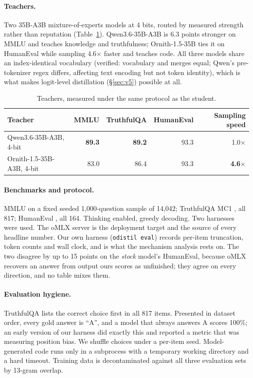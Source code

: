 \documentclass[11pt]{article}
\begin{document}
\paragraph{Teachers.}
Two 35B-A3B mixture-of-experts models at 4 bits, routed by measured strength
rather than reputation (Table~\ref{tab:teachers}).  Qwen3.6-35B-A3B is 6.3
points stronger on MMLU and teaches knowledge and truthfulness; Ornith-1.5-35B
ties it on HumanEval while sampling 4.6$\times$ faster and teaches code.  All
three models share an index-identical vocabulary (verified: vocabulary and
merges equal; Qwen's pre-tokenizer regex differs, affecting text encoding but
not token identity), which is what makes logit-level distillation
(\S\ref{sec:v5}) possible at all.

\begin{table}[t]
\centering
\caption{Teachers, measured under the same protocol as the student.}
\label{tab:teachers}
\begin{tabular}{lrrrr}
\toprule
Teacher & MMLU & TruthfulQA & HumanEval & Sampling speed \\
\midrule
Qwen3.6-35B-A3B, 4-bit & \textbf{89.3} & \textbf{89.2} & 93.3 & 1.0$\times$ \\
Ornith-1.5-35B-A3B, 4-bit & 83.0 & 86.4 & 93.3 & \textbf{4.6}$\times$ \\
\bottomrule
\end{tabular}
\end{table}

\paragraph{Benchmarks and protocol.}
MMLU \citep{hendrycks2021mmlu} on a fixed seeded 1{,}000-question sample of
14{,}042; TruthfulQA MC1 \citep{lin2022truthfulqa}, all 817; HumanEval
\citep{chen2021humaneval}, all 164.  Thinking enabled, greedy decoding.  Two
harnesses were used.  The oMLX server is the deployment target and the source
of every headline number.  Our own harness (\texttt{odistil eval}) records
per-item truncation, token counts and wall clock, and is what the mechanism
analysis rests on.  The two disagree by up to 15 points on the \emph{stock}
model's HumanEval, because oMLX recovers an answer from output ours scores as
unfinished; they agree on every direction, and no table mixes them.

\paragraph{Evaluation hygiene.}
TruthfulQA lists the correct choice first in all 817 items.  Presented in
dataset order, every gold answer is ``A'', and a model that always answers A
scores 100\%; an early version of our harness did exactly this and reported a
metric that was measuring position bias.  We shuffle choices under a per-item
seed.  Model-generated code runs only in a subprocess with a temporary working
directory and a hard timeout.  Training data is decontaminated against all
three evaluation sets by 13-gram overlap.
\end{document}
